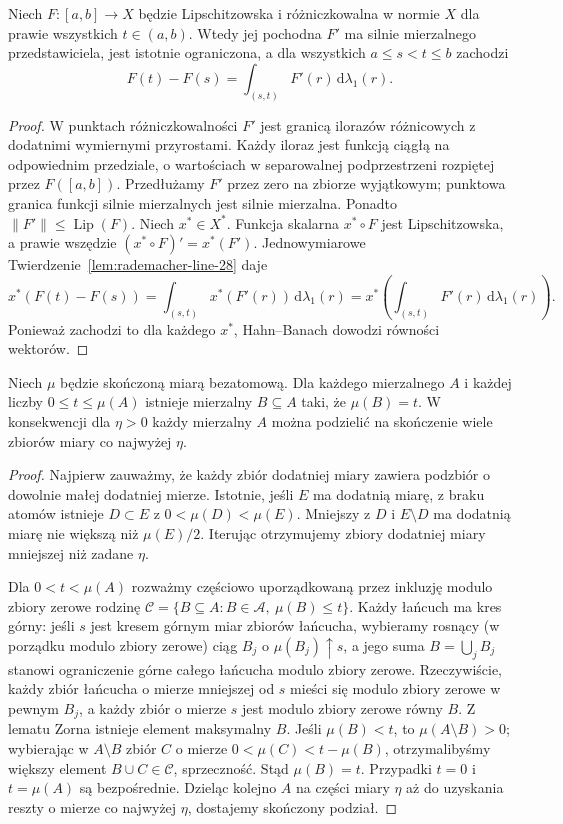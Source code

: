 \begin{lemat}
\label{lem:FTC-Banach-30}
Niech $F:[a,b]\to X$ będzie Lipschitzowska i
różniczkowalna w normie $X$ dla prawie wszystkich
$t\in(a,b)$. Wtedy jej pochodna $F'$ ma silnie
mierzalnego przedstawiciela, jest istotnie ograniczona,
a dla wszystkich $a\le s<t\le b$ zachodzi
\[
 F(t)-F(s)=\int_{(s,t)}F'(r)\,\mathrm d\lambda_1(r).
\]
\end{lemat}
\begin{proof}
W punktach różniczkowalności $F'$ jest granicą
ilorazów różnicowych z dodatnimi wymiernymi
przyrostami. Każdy iloraz jest funkcją ciągłą na
odpowiednim przedziale, o wartościach w separowalnej
podprzestrzeni rozpiętej przez $F([a,b])$.
Przedłużamy $F'$ przez zero na zbiorze wyjątkowym;
punktowa granica funkcji silnie mierzalnych jest
silnie mierzalna. Ponadto $\|F'\|\le\operatorname{Lip}(F)$.
Niech $x^*\in X^*$. Funkcja skalarna
$x^*\circ F$ jest Lipschitzowska, a prawie wszędzie
$(x^*\circ F)'=x^*(F')$. Jednowymiarowe
Twierdzenie~\ref{lem:rademacher-line-28} daje
\[
 x^*(F(t)-F(s))
 =\int_{(s,t)}x^*(F'(r))\,\mathrm d\lambda_1(r)
 =x^*\!\left(\int_{(s,t)}F'(r)\,\mathrm d\lambda_1(r)\right).
\]
Ponieważ zachodzi to dla każdego $x^*$,
Hahn--Banach dowodzi równości wektorów.
\end{proof}

\begin{lemat}
\label{lem:nonatomic-divisibility-30}
Niech $\mu$ będzie skończoną miarą bezatomową.
Dla każdego mierzalnego $A$ i każdej liczby
$0\le t\le\mu(A)$ istnieje mierzalny $B\subseteq A$
taki, że $\mu(B)=t$. W konsekwencji dla $\eta>0$
każdy mierzalny $A$ można podzielić na skończenie
wiele zbiorów miary co najwyżej $\eta$.
\end{lemat}
\begin{proof}
Najpierw zauważmy, że każdy zbiór dodatniej miary
zawiera podzbiór o dowolnie małej dodatniej mierze.
Istotnie, jeśli $E$ ma dodatnią miarę, z braku atomów
istnieje $D\subset E$ z $0<\mu(D)<\mu(E)$.
Mniejszy z $D$ i $E\setminus D$ ma dodatnią miarę
nie większą niż $\mu(E)/2$. Iterując otrzymujemy
zbiory dodatniej miary mniejszej niż zadane $\eta$.

Dla $0<t<\mu(A)$ rozważmy częściowo uporządkowaną
przez inkluzję modulo zbiory zerowe rodzinę
$\mathcal C=\{B\subseteq A:B\in\mathcal A,\ \mu(B)\le t\}$.
Każdy łańcuch ma kres górny: jeśli $s$ jest kresem
górnym miar zbiorów łańcucha, wybieramy rosnący
(w porządku modulo zbiory zerowe) ciąg $B_j$ o
$\mu(B_j)\uparrow s$, a jego suma $B=\bigcup_jB_j$
stanowi ograniczenie górne całego łańcucha modulo
zbiory zerowe. Rzeczywiście, każdy zbiór łańcucha
o mierze mniejszej od $s$ mieści się modulo zbiory
zerowe w pewnym $B_j$, a każdy zbiór o mierze $s$
jest modulo zbiory zerowe równy $B$.
Z lematu Zorna istnieje element maksymalny $B$.
Jeśli $\mu(B)<t$, to $\mu(A\setminus B)>0$;
wybierając w $A\setminus B$ zbiór $C$ o mierze
$0<\mu(C)<t-\mu(B)$, otrzymalibyśmy większy
element $B\cup C\in\mathcal C$, sprzeczność.
Stąd $\mu(B)=t$. Przypadki $t=0$ i $t=\mu(A)$
są bezpośrednie. Dzieląc kolejno $A$ na części
miary $\eta$ aż do uzyskania reszty o mierze
co najwyżej $\eta$, dostajemy skończony podział.
\end{proof}


